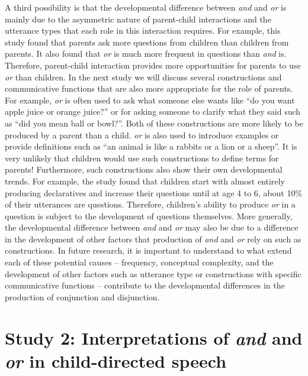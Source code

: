 \documentclass[oneside]{report}
\theoremstyle{definition}
\theoremstyle{definition}
\theoremstyle{definition}
\theoremstyle{remark}
\begin{document}
A third possibility is that the developmental difference between
\emph{and} and \emph{or} is mainly due to the asymmetric nature of
parent-child interactions and the utterance types that each role in this
interaction requires. For example, this study found that parents ask
more questions from children than children from parents. It also found
that \emph{or} is much more frequent in questions than \emph{and} is.
Therefore, parent-child interaction provides more opportunities for
parents to use \emph{or} than children. In the next study we will
discuss several constructions and communicative functions that are also
more appropriate for the role of parents. For example, \emph{or} is
often used to ask what someone else wants like ``do you want apple juice
or orange juice?'' or for asking someone to clarify what they said such
as ``did you mean ball or bowl?''. Both of these constructions are more
likely to be produced by a parent than a child. \emph{or} is also used
to introduce examples or provide definitions such as ``an animal is like
a rabbits or a lion or a sheep''. It is very unlikely that children
would use such constructions to define terms for parents! Furthermore,
such constructions also show their own developmental trends. For
example, the study found that children start with almost entirely
producing declaratives and increase their questions until at age 4 to 6,
about 10\% of their utterances are questions. Therefore, children's
ability to produce \emph{or} in a question is subject to the development
of questions themselves. More generally, the developmental difference
between \emph{and} and \emph{or} may also be due to a difference in the
development of other factors that production of \emph{and} and \emph{or}
rely on such as constructions. In future research, it is important to
understand to what extend each of these potential causes -- frequency,
conceptual complexity, and the development of other factors such as
utterance type or constructions with specific communicative functions --
contribute to the developmental differences in the production of
conjunction and disjunction.

\section{\texorpdfstring{Study 2: Interpretations of \emph{and} and
\emph{or} in child-directed
speech}{Study 2: Interpretations of and and or in child-directed speech}}\label{study-2-interpretations-of-and-and-or-in-child-directed-speech}
\end{document}
